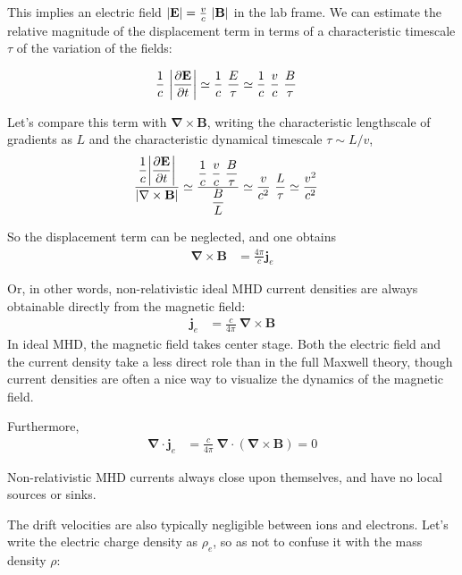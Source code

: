 \documentclass[notoc]{tufte-handout}
\renewcommand{\vec}[1]{
\mathbf{#1}
}
\newcommand{\del}{
\vec{\nabla}
}
\newcommand{\E}{
\vec{E}
}
\newcommand{\B}{
\vec{B}
}
\begin{document}
This implies an electric field  $\abs{\E}=\frac{v}{c}\ \abs {\vec {B}}$ in the lab frame. We can estimate the relative magnitude of the displacement term in terms of a characteristic timescale $\tau$ of the variation of the fields:

\begin{align}
\frac{1}{c}~\abs{\frac{\partial \E}{\partial t}} & \simeq \frac{1}{c}~\frac{E}{\tau} \simeq \frac{1}{c}~\frac{v}{c}~\frac{B}{\tau}
\end{align}

Let's compare this term with $\del \times \B$, writing the characteristic lengthscale of gradients as $L$ and the characteristic dynamical timescale $\tau \sim L / v$, 
\begin{align}
\frac{\displaystyle\frac{1}{c} \abs{\frac{\partial \E}{\partial t}} }{\abs{\del \times \B}} & \simeq \frac{\displaystyle\frac{1}{c}~\frac{v}{c}~\frac{B}{\tau}}{\displaystyle\frac{B}{L}} \simeq \frac{v}{c^2}~\frac{L}{\tau} \simeq \frac{v^2}{c^2}
\end{align}
%

So the displacement term can be neglected, and one obtains
\begin{align}
    \del \times \B & = \frac{4\pi}{c}\vec{j}_e
\end{align}

Or, in other words, non-relativistic ideal MHD current densities are always obtainable directly from the magnetic field:
\begin{align}
    \vec{j}_e &= \frac{c}{4\pi}~\del \times \B 
\end{align}
%
In ideal MHD, the magnetic field takes center stage. Both the electric field and the current density take a less direct role than in the full Maxwell theory, though current densities are often a nice way to visualize the dynamics of the magnetic field. 

Furthermore, 
\begin{align}
    \del \cdot \vec{j}_e & = \frac{c}{4\pi}~\del \cdot \left(\del \times \B \right) = 0
\end{align}

Non-relativistic MHD currents always close upon themselves, and have no local sources or sinks. 

The drift velocities are also typically negligible between ions and electrons. Let's write the electric charge density as $\rho_e$, so as not to confuse it with the mass density $\rho$:
\end{document}

